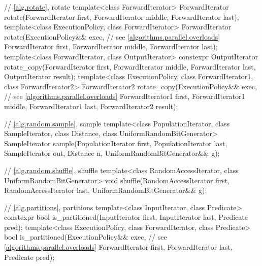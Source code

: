 \begin{codeblock}
{  // \ref{alg.rotate}, rotate
  template<class ForwardIterator>
    ForwardIterator rotate(ForwardIterator first,
                           ForwardIterator middle,
                           ForwardIterator last);
  template<class ExecutionPolicy, class ForwardIterator>
    ForwardIterator rotate(ExecutionPolicy&& exec, // see \ref{algorithms.parallel.overloads}
                           ForwardIterator first,
                           ForwardIterator middle,
                           ForwardIterator last);
  template<class ForwardIterator, class OutputIterator>
    constexpr OutputIterator
      rotate_copy(ForwardIterator first, ForwardIterator middle,
                  ForwardIterator last, OutputIterator result);
  template<class ExecutionPolicy, class ForwardIterator1, class ForwardIterator2>
    ForwardIterator2
      rotate_copy(ExecutionPolicy&& exec, // see \ref{algorithms.parallel.overloads}
                  ForwardIterator1 first, ForwardIterator1 middle,
                  ForwardIterator1 last, ForwardIterator2 result);

  // \ref{alg.random.sample}, sample
  template<class PopulationIterator, class SampleIterator,
           class Distance, class UniformRandomBitGenerator>
    SampleIterator sample(PopulationIterator first, PopulationIterator last,
                          SampleIterator out, Distance n,
                          UniformRandomBitGenerator&& g);

  // \ref{alg.random.shuffle}, shuffle
  template<class RandomAccessIterator, class UniformRandomBitGenerator>
    void shuffle(RandomAccessIterator first,
                 RandomAccessIterator last,
                 UniformRandomBitGenerator&& g);

  // \ref{alg.partitions}, partitions
  template<class InputIterator, class Predicate>
    constexpr bool is_partitioned(InputIterator first, InputIterator last, Predicate pred);
  template<class ExecutionPolicy, class ForwardIterator, class Predicate>
    bool is_partitioned(ExecutionPolicy&& exec, // see \ref{algorithms.parallel.overloads}
                        ForwardIterator first, ForwardIterator last, Predicate pred);

}
\end{codeblock}
